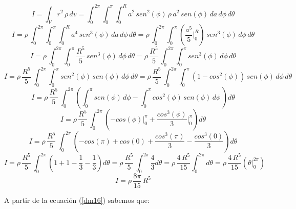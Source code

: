\documentclass[letter,oneside,11pt]{article}
\begin{document}
\begin{equation*}
    I = \int_{V} r^2\, \rho\, dv = \int_{0}^{2\pi} \int_{0}^{\pi} \int_{0}^{R} a^2\, sen^2(\phi)\, \rho\, a^2\, sen (\phi)\, da\, d\phi\, d\theta
\end{equation*}
\begin{equation*}
    I = \rho\, \int_{0}^{2\pi} \int_{0}^{\pi} \int_{0}^{R} a^4\, sen^3(\phi)\, da\, d\phi\, d\theta = \rho\, \int_{0}^{2\pi} \int_{0}^{\pi} \left(\frac{a^5}{5}\Biggr|_{0}^{R}\right)\, sen^3(\phi)\, d\phi\, d\theta
\end{equation*}
\begin{equation*}
    I = \rho\, \int_{0}^{2\pi} \int_{0}^{\pi} \frac{R^5}{5}\, sen^3(\phi)\, d\phi\, d\theta = \rho\, \frac{R^5}{5}\, \int_{0}^{2\pi} \int_{0}^{\pi} sen^3(\phi)\, d\phi\, d\theta
\end{equation*}
\begin{equation*}
    I = \rho\, \frac{R^5}{5}\, \int_{0}^{2\pi} \int_{0}^{\pi} sen^2(\phi)\, sen(\phi)\, d\phi\, d\theta = \rho\, \frac{R^5}{5}\, \int_{0}^{2\pi} \int_{0}^{\pi} (1 - cos^2(\phi))\, sen(\phi)\, d\phi\, d\theta
\end{equation*}
\begin{equation*}
    I = \rho\, \frac{R^5}{5}\, \int_{0}^{2\pi} \left( \int_{0}^{\pi} sen(\phi)\, d\phi - \int_{0}^{\pi} cos^2(\phi)\, sen(\phi)\, d\phi\, \right) d\theta
\end{equation*}
\begin{equation*}
    I = \rho\, \frac{R^5}{5}\, \int_{0}^{2\pi} \left( -cos(\phi)\Biggr|_{0}^{\pi} + \frac{cos^3(\phi)}{3}\Biggr|_{0}^{\pi} \right) d\theta
\end{equation*}
\begin{equation*}
    I = \rho\, \frac{R^5}{5}\, \int_{0}^{2\pi} \left( -cos(\pi) + cos(0) + \frac{cos^3(\pi)}{3} - \frac{cos^3(0)}{3} \right) d\theta
\end{equation*}
\begin{equation*}
    I = \rho\, \frac{R^5}{5}\, \int_{0}^{2\pi} \left( 1 + 1 - \frac{1}{3} - \frac{1}{3} \right) d\theta = \rho\, \frac{R^5}{5}\, \int_{0}^{2\pi} \frac{4}{3} d\theta = \rho\, \frac{4\, R^5}{15} \int_{0}^{2\pi} d\theta = \rho\, \frac{4\, R^5}{15} ( \theta \Biggr|_{0}^{2\pi} )
\end{equation*}
\begin{equation}
    I = \rho\, \frac{8\pi}{15}\, R^5
\label{resultado16}
\end{equation}

A partir de la ecuación (\ref{dm16}) sabemos que:
\end{document}

